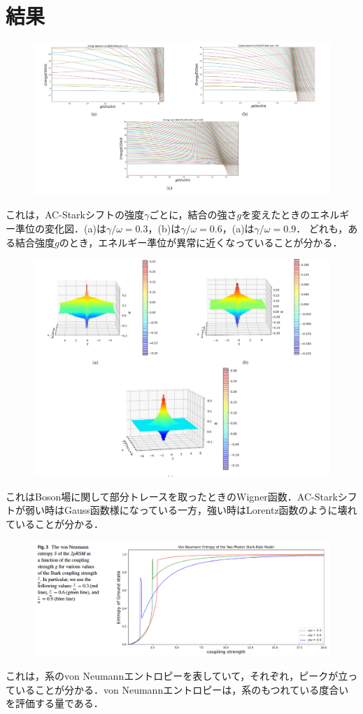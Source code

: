 \documentclass{report}
\begin{document}
    \section{結果}
      \begin{figure}[H]
        \centering
        \includegraphics[width = 0.5\linewidth]{./src/Quantum_entanglement_in_two-photon_Rabi_Stark_model/1.png}
      \end{figure}
      これは，AC-Starkシフトの強度$\gamma$ごとに，結合の強さ$g$を変えたときのエネルギー準位の変化図．(a)は$\gamma/\omega = 0.3$，(b)は$\gamma/\omega = 0.6$，(a)は$\gamma/\omega = 0.9$．
      どれも，ある結合強度$g$のとき，エネルギー準位が異常に近くなっていることが分かる．
      \begin{figure}[H]
        \centering
        \includegraphics[width = 0.5\linewidth]{./src/Quantum_entanglement_in_two-photon_Rabi_Stark_model/2.png}
      \end{figure}
      これはBoson場に関して部分トレースを取ったときのWigner函数．AC-Starkシフトが弱い時はGauss函数様になっている一方，強い時はLorentz函数のように壊れていることが分かる．
      \begin{figure}[H]
        \centering
        \includegraphics[width = 0.5\linewidth]{./src/Quantum_entanglement_in_two-photon_Rabi_Stark_model/3.png}
      \end{figure}
      これは，系のvon Neumannエントロピーを表していて，それぞれ，ピークが立っていることが分かる．von Neumannエントロピーは，系のもつれている度合いを評価する量である．
  \appendix
\end{document}
